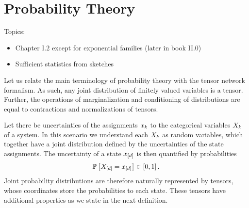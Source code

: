 \chapter{Probability Theory}\label{cha:probabilityTheory}


Topics:
\begin{itemize}
    \item Chapter I.2 except for exponential families (later in book II.0)
    \item Sufficient statistics from sketches
\end{itemize}



Let us relate the main terminology of probability theory with the tensor network formalism.
As such, any joint distribution of finitely valued variables is a tensor.
Further, the operations of marginalization and conditioning of distributions are equal to contractions and normalizations of tensors.


Let there be uncertainties of the assignments $x_{k}$ to the categorical variables $X_{k}$ of a system.
In this scenario we understand each $X_{k}$ as random variables, which together have a joint distribution defined by the uncertainties of the state assignments.
The uncertainty of a state $x_{[d]}$ is then quantified by probabilities
\begin{align*}
    \mathbb{P}\left[X_{[d]}=x_{[d]}\right] \in [0,1] \, .
\end{align*}
Joint probability distributions are therefore naturally represented by tensors, whose coordinates store the probabilities to each state.
These tensors have additional properties as we state in the next definition.

